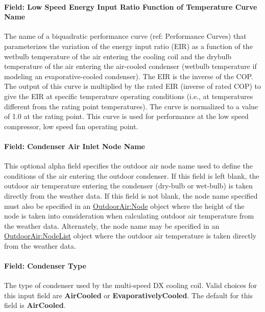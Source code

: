 \paragraph{Field: Low Speed Energy Input Ratio Function of Temperature Curve Name}\label{field-low-speed-energy-input-ratio-function-of-temperature-curve-name}

The name of a biquadratic performance curve (ref: Performance Curves) that parameterizes the variation of the energy input ratio (EIR) as a function of the wetbulb temperature of the air entering the cooling coil and the drybulb temperature of the air entering the air-cooled condenser (wetbulb temperature if modeling an evaporative-cooled condenser). The EIR is the inverse of the COP. The output of this curve is multiplied by the rated EIR (inverse of rated COP) to give the EIR at specific temperature operating conditions (i.e., at temperatures different from the rating point temperatures). The curve is normalized to a value of 1.0 at the rating point. This curve is used for performance at the low speed compressor, low speed fan operating point.

\paragraph{Field: Condenser Air Inlet Node Name}\label{field-condenser-air-inlet-node-name-1}

This optional alpha field specifies the outdoor air node name used to define the conditions of the air entering the outdoor condenser. If this field is left blank, the outdoor air temperature entering the condenser (dry-bulb or wet-bulb) is taken directly from the weather data. If this field is not blank, the node name specified must also be specified in an \hyperref[outdoorairnode]{OutdoorAir:Node} object where the height of the node is taken into consideration when calculating outdoor air temperature from the weather data. Alternately, the node name may be specified in an \hyperref[outdoorairnodelist]{OutdoorAir:NodeList} object where the outdoor air temperature is taken directly from the weather data.

\paragraph{Field: Condenser Type}\label{field-condenser-type-1}

The type of condenser used by the multi-speed DX cooling coil. Valid choices for this input field are \textbf{AirCooled} or \textbf{EvaporativelyCooled}. The default for this field is \textbf{AirCooled}.

